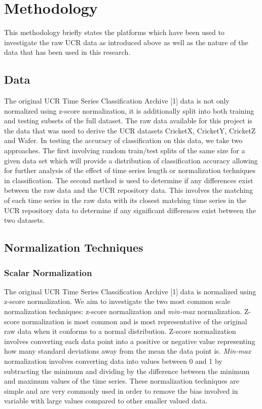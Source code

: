 \documentclass[10pt,a4paper]{article}
\begin{document}
\section{Methodology}

This methodology briefly states the platforms which have been used to investigate the raw UCR data as introduced above as well as the nature of the data that has been used in this research.

\subsection{Data}

The original UCR Time Series Classification Archive [1] data is not only normalized using z-score normalization, it is additionally split into both training and testing subsets of the full dataset. 
The raw data available for this project is the data that was used to derive the UCR datasets CricketX, CricketY, CricketZ and Wafer.
In testing the accuracy of classification on this data, we take two approaches.
The first involving random train/test splits of the same size for a given data set which will provide a distribution of classification accuracy allowing for further analysis of the effect of time series length or normalization techniques in classification.
The second method is used to determine if any differences exist between the raw data and the UCR repository data.
This involves the matching of each time series in the raw data with its closest matching time series in the UCR repository data to determine if any significant differences exist between the two datasets.

\subsection{Normalization Techniques}

\subsubsection{Scalar Normalization}

The original UCR Time Series Classification Archive [1] data is normalized using z-score normalization.
We aim to investigate the two most common scale normalization techniques: z-score normalization and \textit{min-max} normalization.
Z-score normalization is most common and is most representative of the original raw data when it conforms to a normal distribution.
Z-score normalization involves converting each data point into a positive or negative value representing how many standard deviations away from the mean the data point is.
\textit{Min-max} normalization involves converting data into values between 0 and 1 by subtracting the minimum and dividing by the difference between the minimum and maximum values of the time series.
These normalization techniques are simple and are very commonly used in order to remove the bias involved in variable with large values compared to other smaller valued data.
\end{document}
